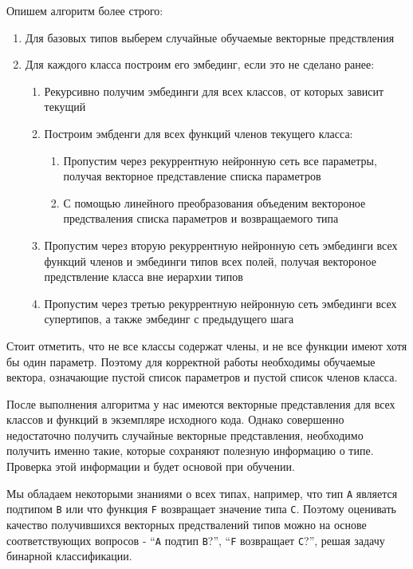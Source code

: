 \documentclass[times,specification,annotation]{itmo-student-thesis}
\begin{document}
Опишем алгоритм более строго:
\begin{enumerate}
    \item Для базовых типов выберем случайные обучаемые векторные предствления
    \item Для каждого класса построим его эмбединг, если это не сделано ранее:
    \begin{enumerate}
        \item Рекурсивно получим эмбединги для всех классов, от которых зависит текущий
        \item Построим эмбденги для всех функций членов текущего класса:
        \begin{enumerate}
            \item Пропустим через рекуррентную нейронную сеть все параметры, получая векторное представление списка параметров
            \item С помощью линейного преобразования объеденим вектороное предстваления списка параметров и возвращаемого типа
        \end{enumerate}
        \item Пропустим через вторую рекуррентную нейронную сеть эмбединги всех функций членов и эмбединги типов всех полей, получая вектороное предствление класса вне иерархии типов
        \item Пропустим через третью рекуррентную нейронную сеть эмбединги всех супертипов, а также эмбединг с предыдущего шага
    \end{enumerate}
\end{enumerate}

Стоит отметить, что не все классы содержат члены, и не все функции имеют хотя бы один параметр. Поэтому для корректной работы необходимы обучаемые вектора, означающие пустой список параметров и пустой список членов класса.

После выполнения алгоритма у нас имеются векторные представления для всех классов и функций в экземпляре исходного кода. Однако совершенно недостаточно получить случайные векторные представления, необходимо получить именно такие, которые сохраняют полезную информацию о типе. Проверка этой информации и будет основой при обучении. 

Мы обладаем некоторыми знаниями о всех типах, например, что тип \texttt{A} является подтипом \texttt{B} или что функция \texttt{F} возвращает значение типа \texttt{C}. Поэтому оценивать качество получившихся векторных предствалений типов можно на основе соответствующих вопросов - ``\texttt{A} подтип \texttt{B}?'', ``\texttt{F} возвращает \texttt{C}?'', решая задачу бинарной классификации.
\end{document}
